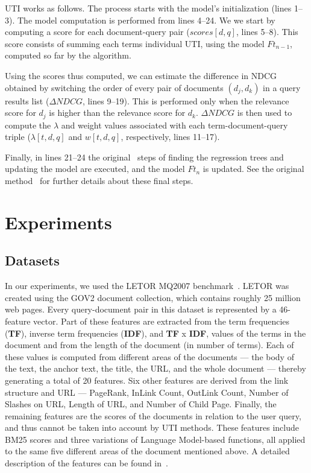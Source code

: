 \documentclass[preprint,review,10pt,3p]{elsarticle}
\begin{document}
UTI \lambdamart works as follows.
The process starts with the model's initialization (lines 1--3). The model computation is performed from lines 4--24. We we start by computing a score for each document-query pair ($scores[d,q]$, lines 5--8). 
This score consists of summing each terms individual UTI, using the model $Ft_{n-1}$, computed so far by the algorithm. 

Using the scores thus computed, we can estimate the difference in NDCG obtained by switching the order of every pair of documents $(d_j,d_k)$ in a query results list ($\Delta NDCG$, lines 9--19). This is performed only when the relevance score for $d_j$ is higher than the relevance score for $d_k$. $\Delta NDCG$ is then used  to compute the $\lambda$ and weight values associated with each term-document-query triple ($\lambda[t,d,q]$ and $w[t,d,q]$, respectively, lines 11--17).

Finally, in lines 21--24 the original \lambdamart\ steps of finding the regression trees and updating the model are executed, and the model $Ft_n$ is updated. See the original method~\cite{wu2010lambdamart} for further details about these final steps.

\section{Experiments}
\label{experiments}


\subsection{Datasets}
\label{sec:datasets}

In our experiments, we used the LETOR MQ2007 benchmark~\cite{liu2007letor}. LETOR  was  created using  the GOV2 document collection, which contains roughly 25 million web pages.  Every query-document pair in this dataset is represented by a 46-feature vector. Part of these features are extracted from the term frequencies (\textbf{TF}), inverse term frequencies (\textbf{IDF}), and \textbf{TF} x \textbf{IDF}, values of the terms in the document and from the length of the document (in number of terms). Each of these values is computed from different areas of the documents --- the body of the text, the anchor text, the title, the URL, and the whole document --- thereby generating a total of 20 features. Six other features are derived from the link structure and URL --- PageRank, InLink Count, OutLink Count, Number of Slashes on URL, Length of URL, and Number of Child Page. Finally, the remaining features are the scores of the documents in relation to the user query, and thus cannot be taken into account by UTI methods. These features include BM25  scores and three variations of Language Model-based functions, all applied to the same five different areas of the document mentioned above.  A detailed description of the features can be found in~\cite{liu2007letor}. 
\end{document}
